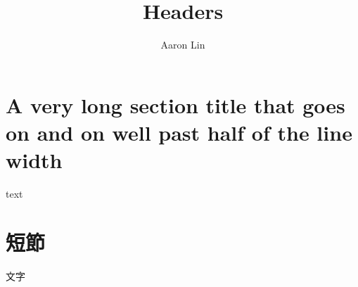\documentclass[footer=page-total]{akizumi-note}
\title{Headers}
\author{Aaron Lin}
\begin{document}
\maketitle
\section{A very long section title that goes on and on well past half of the line width}
text \newpage
\section{短節}
文字
\end{document}
